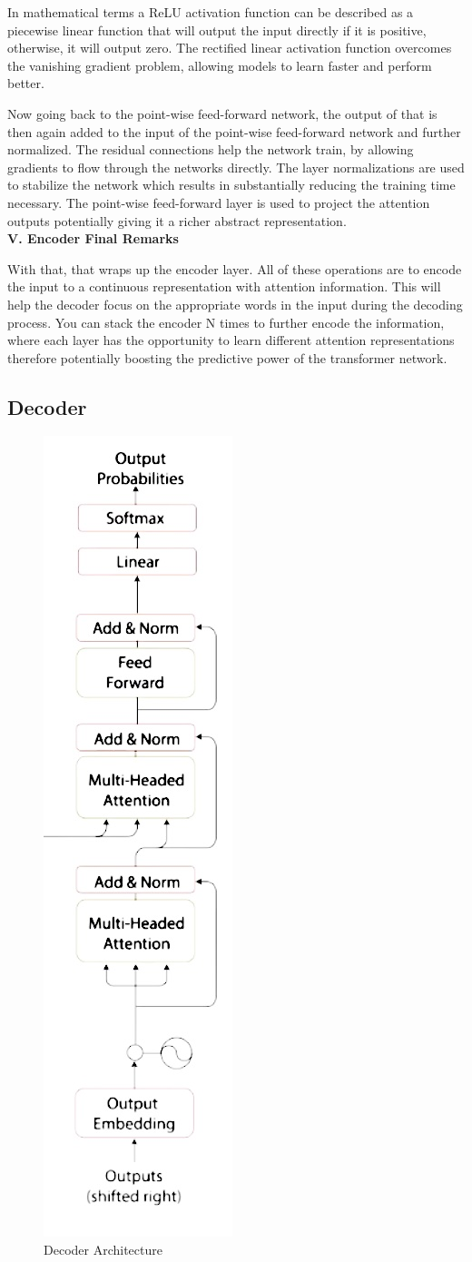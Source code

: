 \newpage
\noindent
In mathematical terms a ReLU activation function can be described as a piecewise linear function that will output the input directly if it is positive, otherwise, it will output zero. The rectified linear activation function overcomes the vanishing gradient problem, allowing models to learn faster and perform better.

Now going back to the point-wise feed-forward network, the output of that is then again added to the input of the point-wise feed-forward network and further normalized. The residual connections help the network train, by allowing gradients to flow through the networks directly. The layer normalizations are used to stabilize the network which results in substantially reducing the training time necessary. The point-wise feed-forward layer is used to project the attention outputs potentially giving it a richer abstract representation. \\

\noindent
\textbf{V. Encoder Final Remarks}

With that, that wraps up the encoder layer. All of these operations are to encode the input to a continuous representation with attention information. This will help the decoder focus on the appropriate words in the input during the decoding process. You can stack the encoder N times to further encode the information, where each layer has the opportunity to learn different attention representations therefore potentially boosting the predictive power of the transformer network.

\subsection{Decoder}

\begin{figure}[H]
\centering
\includegraphics[width=.14\textwidth]{figures/t11.jpg}
\caption{Decoder Architecture}
\end{figure}

